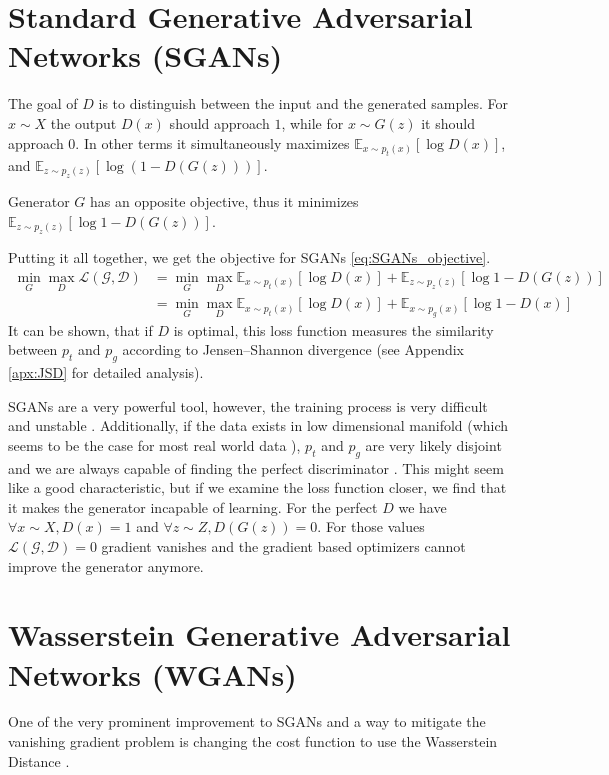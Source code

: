 \section{Standard Generative Adversarial Networks (SGANs)}
The goal of $D$ is to distinguish between the input and the generated samples. For $x
\sim X$ the output $D(x)$ should approach $1$, while for $x \sim G(z)$ it should
approach $0$. In other terms it simultaneously maximizes $\mathbb{E}_{x \sim
  p_t(x)}[\log{D(x)}]$, and $\mathbb{E}_{z \sim p_z(z)}[\log{(1 - D(G(z)))}]$.

Generator $G$ has an opposite objective, thus it minimizes $\mathbb{E}_{z
  \sim p_z(z)}[\log{1 - D(G(z))}]$.

Putting it all together, we get the objective for SGANs \eqref{eq:SGANs_objective}.
\begin{equation}
  \label{eq:SGANs_objective}
  \begin{split}
    \min_G\max_D\mathcal{L(G, D)} & = \min_G\max_D \mathbb{E}_{x \sim p_t(x)}[\log{D(x)}] +  \mathbb{E}_{z \sim p_z(z)}[\log{1 - D(G(z))}] \\
    & = \min_G\max_D \mathbb{E}_{x \sim p_t(x)}[\log{D(x)}] +  \mathbb{E}_{x \sim p_g(x)}[\log{1 - D(x)}]
  \end{split}
\end{equation}
It can be shown, that if $D$ is optimal, this loss function measures the similarity between 
$p_t$ and $p_g$ according to Jensen–Shannon divergence (see Appendix
\ref{apx:JSD} for detailed analysis). 

SGANs are a very powerful tool, however, the training process is very difficult
and unstable \cite{salimans2016improved}. Additionally, if the data exists in
low dimensional manifold (which seems to be the case for most real world data
\cite{narayanan2010proceedings}), $p_t$ and $p_g$ are very likely disjoint and we are always capable of finding the perfect discriminator 
\cite{arjovsky2017principled}. This might seem like a good
characteristic, but if we examine the loss function closer, we find that it
makes the generator incapable of learning. For the perfect $D$ we have $\forall x
\sim X, D(x) = 1$ and $\forall z \sim Z, D(G(z)) = 0$. For those values
$\mathcal{L(G,D)} = 0$ gradient vanishes and the gradient based optimizers cannot improve the
generator anymore.
\section{Wasserstein Generative Adversarial Networks (WGANs)}
One of the very prominent improvement to SGANs and a way to mitigate the
vanishing gradient problem is changing the cost function to use the Wasserstein
Distance \cite{arjovsky2017wasserstein}.

